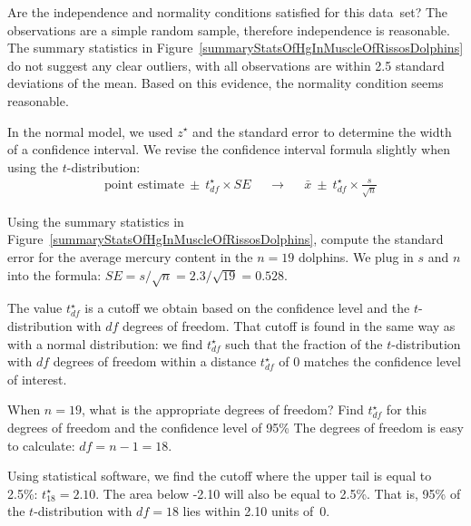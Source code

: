 \begin{examplewrap}
\begin{nexample}{Are the independence and
    normality conditions satisfied for this data~set?}
  The observations are a simple random sample,
  therefore independence is reasonable.
  The summary statistics in
  Figure~\ref{summaryStatsOfHgInMuscleOfRissosDolphins}
  do not suggest any clear outliers, with
  all observations are within 2.5 standard deviations
  of the mean.
  Based on this evidence, the normality condition
  seems reasonable.
\end{nexample}
\end{examplewrap}

In the normal model, we used $z^{\star}$ and the standard error to determine the width of a confidence interval. We revise the confidence interval formula slightly when using the $t$-distribution:
\begin{align*}
&\text{point estimate} \ \pm\  t^{\star}_{df} \times SE
&&\to
&&\bar{x} \ \pm\  t^{\star}_{df} \times \frac{s}{\sqrt{n}}
\end{align*}

\begin{examplewrap}
\begin{nexample}{Using the summary statistics in
    Figure~\ref{summaryStatsOfHgInMuscleOfRissosDolphins},
    compute the standard error for the average
    mercury content in the $n = 19$ dolphins.}
  We plug in $s$ and $n$ into the formula:
  $
  SE
    = s / \sqrt{n}
    = 2.3 / \sqrt{19}
    = 0.528
  $.
\end{nexample}
\end{examplewrap}

The value $t^{\star}_{df}$ is a cutoff we obtain based on the
confidence level and the $t$-distribution with $df$ degrees
of freedom.
That cutoff is found in the same way as with a normal
distribution: we find $t^{\star}_{df}$ such that
the fraction of the $t$-distribution with $df$ degrees
of freedom within a distance $t^{\star}_{df}$
of 0 matches the confidence level of interest.

\begin{examplewrap}
\begin{nexample}{When $n = 19$, what is the appropriate
    degrees of freedom?
    Find $t^{\star}_{df}$ for this degrees of freedom
    and the confidence level of 95\%}
  The degrees of freedom is easy to calculate:
  $df = n - 1 = 18$.
  
  Using statistical software, we find the cutoff where
  the upper tail is equal to 2.5\%:
  $t^{\star}_{18} = 2.10$.
  The area below -2.10 will also be equal to 2.5\%.
  That is, 95\% of the $t$-distribution with $df = 18$
  lies within 2.10 units of~0.
\end{nexample}
\end{examplewrap}

